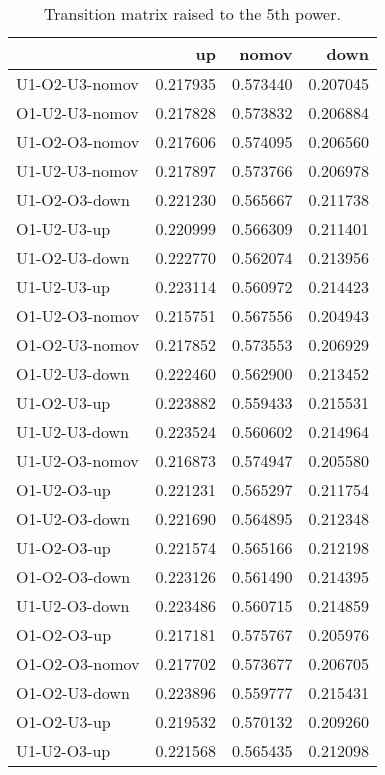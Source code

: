 \begin{table}[H]
\caption{Transition matrix raised to the 5th power.}
\centering
\begin{tabular}{lrrr}
\toprule
{} &        up &     nomov &      down \\
\midrule
U1-O2-U3-nomov &  0.217935 &  0.573440 &  0.207045 \\
O1-U2-U3-nomov &  0.217828 &  0.573832 &  0.206884 \\
U1-O2-O3-nomov &  0.217606 &  0.574095 &  0.206560 \\
U1-U2-U3-nomov &  0.217897 &  0.573766 &  0.206978 \\
U1-O2-O3-down  &  0.221230 &  0.565667 &  0.211738 \\
O1-U2-U3-up    &  0.220999 &  0.566309 &  0.211401 \\
U1-O2-U3-down  &  0.222770 &  0.562074 &  0.213956 \\
U1-U2-U3-up    &  0.223114 &  0.560972 &  0.214423 \\
O1-U2-O3-nomov &  0.215751 &  0.567556 &  0.204943 \\
O1-O2-U3-nomov &  0.217852 &  0.573553 &  0.206929 \\
O1-U2-U3-down  &  0.222460 &  0.562900 &  0.213452 \\
U1-O2-U3-up    &  0.223882 &  0.559433 &  0.215531 \\
U1-U2-U3-down  &  0.223524 &  0.560602 &  0.214964 \\
U1-U2-O3-nomov &  0.216873 &  0.574947 &  0.205580 \\
O1-U2-O3-up    &  0.221231 &  0.565297 &  0.211754 \\
O1-U2-O3-down  &  0.221690 &  0.564895 &  0.212348 \\
U1-O2-O3-up    &  0.221574 &  0.565166 &  0.212198 \\
O1-O2-O3-down  &  0.223126 &  0.561490 &  0.214395 \\
U1-U2-O3-down  &  0.223486 &  0.560715 &  0.214859 \\
O1-O2-O3-up    &  0.217181 &  0.575767 &  0.205976 \\
O1-O2-O3-nomov &  0.217702 &  0.573677 &  0.206705 \\
O1-O2-U3-down  &  0.223896 &  0.559777 &  0.215431 \\
O1-O2-U3-up    &  0.219532 &  0.570132 &  0.209260 \\
U1-U2-O3-up    &  0.221568 &  0.565435 &  0.212098 \\
\bottomrule
\end{tabular}
\label{Tab: four_h_power}
\end{table}

